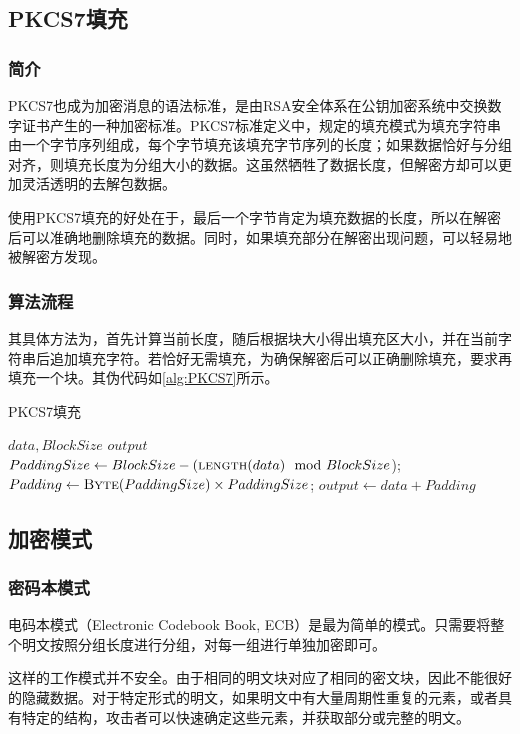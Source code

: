 \documentclass[a4paper, zihao=-4, UTF-8]{ctexart}
\begin{document}
			\subsection{PKCS7填充}
				\subsubsection{简介}
				PKCS7也成为加密消息的语法标准，是由RSA安全体系在公钥加密系统中交换数字证书产生的一种加密标准。PKCS7标准定义中，规定的填充模式为填充字符串由一个字节序列组成，每个字节填充该填充字节序列的长度；如果数据恰好与分组对齐，则填充长度为分组大小的数据。这虽然牺牲了数据长度，但解密方却可以更加灵活透明的去解包数据。

				使用PKCS7填充的好处在于，最后一个字节肯定为填充数据的长度，所以在解密后可以准确地删除填充的数据。同时，如果填充部分在解密出现问题，可以轻易地被解密方发现。
				\subsubsection{算法流程}
				其具体方法为，首先计算当前长度，随后根据块大小得出填充区大小，并在当前字符串后追加填充字符。若恰好无需填充，为确保解密后可以正确删除填充，要求再填充一个块。其伪代码如\cref{alg:PKCS7}所示。
				\begin{algorithm}
					\caption{PKCS7填充}
					\label{alg:PKCS7}
					\begin{algorithmic}[1]
						\Require $data, BlockSize$
						\Ensure $output$
						\State $PaddingSize\gets BlockSize - (\Call{length}{data}\mod BlockSize$);
						\State $Padding\gets \Call{Byte}{PaddingSize} \times PaddingSize$;
						\State $output \gets data + Padding$
						\State {}
						\EndFunction
					\end{algorithmic}
				\end{algorithm}
			\subsection{加密模式}
				\subsubsection{密码本模式}
					电码本模式（Electronic Codebook Book, ECB）是最为简单的模式。只需要将整个明文按照分组长度进行分组，对每一组进行单独加密即可。
					
					这样的工作模式并不安全。由于相同的明文块对应了相同的密文块，因此不能很好的隐藏数据。对于特定形式的明文，如果明文中有大量周期性重复的元素，或者具有特定的结构，攻击者可以快速确定这些元素，并获取部分或完整的明文。
					
\end{document}
